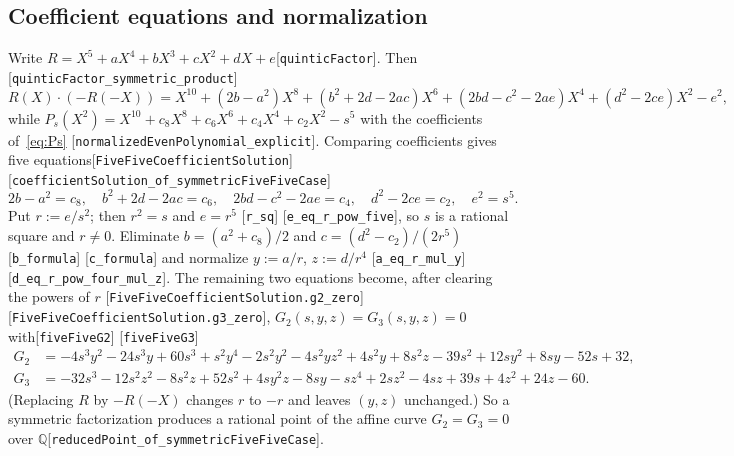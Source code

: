 \documentclass[10pt]{article}
\theoremstyle{definition}
\theoremstyle{remark}
\newcommand{\Q}{\mathbb{Q}}
\newcommand{\leanref}[1]{{\scriptsize\textup{[\texttt{#1}]}}\allowbreak}
\begin{document}
\subsection{Coefficient equations and normalization}

Write $R=X^5+aX^4+bX^3+cX^2+dX+e$\leanref{quintic\allowbreak Factor}.  Then
\leanref{quintic\allowbreak Factor\_\allowbreak symmetric\_\allowbreak product}
\[
R(X)\cdot(-R(-X))=X^{10}+(2b-a^2)X^8+(b^2+2d-2ac)X^6+(2bd-c^2-2ae)X^4+(d^2-2ce)X^2-e^2,
\]
while $P_s(X^2)=X^{10}+c_8X^8+c_6X^6+c_4X^4+c_2X^2-s^5$ with the coefficients
of~\eqref{eq:Ps} \leanref{normalized\allowbreak Even\allowbreak Polynomial\_\allowbreak explicit}.  Comparing
coefficients gives five equations\leanref{Five\allowbreak Five\allowbreak Coefficient\allowbreak Solution} \leanref{coefficient\allowbreak Solution\_\allowbreak of\_\allowbreak symmetric\allowbreak Five\allowbreak Five\allowbreak Case}
\begin{equation}\label{eq:E}
 2b-a^2=c_8,\quad b^2+2d-2ac=c_6,\quad 2bd-c^2-2ae=c_4,\quad d^2-2ce=c_2,\quad e^2=s^5 .
\end{equation}
Put $r:=e/s^2$; then $r^2=s$ and $e=r^5$
\leanref{r\_\allowbreak sq} \leanref{e\_\allowbreak eq\_\allowbreak r\_\allowbreak pow\_\allowbreak five}, so $s$ is a rational square and
$r\ne0$.  Eliminate $b=(a^2+c_8)/2$ and $c=(d^2-c_2)/(2r^5)$
\leanref{b\_\allowbreak formula} \leanref{c\_\allowbreak formula} and normalize $y:=a/r$, $z:=d/r^4$
\leanref{a\_\allowbreak eq\_\allowbreak r\_\allowbreak mul\_\allowbreak y} \leanref{d\_\allowbreak eq\_\allowbreak r\_\allowbreak pow\_\allowbreak four\_\allowbreak mul\_\allowbreak z}.  The remaining two
equations become, after clearing the powers of $r$
\leanref{Five\allowbreak Five\allowbreak Coefficient\allowbreak Solution.g2\_\allowbreak zero} \leanref{Five\allowbreak Five\allowbreak Coefficient\allowbreak Solution.g3\_\allowbreak zero},
$G_2(s,y,z)=G_3(s,y,z)=0$ with\leanref{five\allowbreak Five\allowbreak G2} \leanref{five\allowbreak Five\allowbreak G3}
\begin{align*}
G_2&=-4s^3y^2-24s^3y+60s^3+s^2y^4-2s^2y^2-4s^2yz^2+4s^2y+8s^2z-39s^2+12sy^2+8sy-52s+32,\\
G_3&=-32s^3-12s^2z^2-8s^2z+52s^2+4sy^2z-8sy-sz^4+2sz^2-4sz+39s+4z^2+24z-60 .
\end{align*}
(Replacing $R$ by $-R(-X)$ changes $r$ to $-r$ and leaves $(y,z)$ unchanged.)
So a symmetric factorization produces a rational point of the affine curve
$G_2=G_3=0$ over $\Q$\leanref{reduced\allowbreak Point\_\allowbreak of\_\allowbreak symmetric\allowbreak Five\allowbreak Five\allowbreak Case}.
\end{document}
